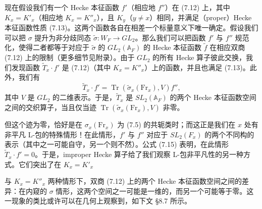 \documentclass[11pt,a4paper]{article}
\newcommand{\Tr}{\operatorname{Tr}}
\begin{document}
现在假设我们有一个 Hecke 本征函数 $f'$（相应地 $f''$）在 (7.12) 上，其中 $K_x=K'_x$（相应地 $K_x=K''_x$），且 $K_y$（$y\neq x$）相同，并满足（proper）Hecke 本征函数性质 (7.13)。这两个函数各自在相差一个标量意义下唯一确定。假设我们可以把 $\sigma$ 提升为非分歧同态 $\tilde\sigma: W_F\to GL_2$。那么我们可以把函数 $f'$ 与 $f''$ 规范化，使得二者都等于对应于 $\tilde\sigma$ 的 $GL_2(\mathbb{A}_F)$ 的 Hecke 本征函数 $\tilde f$ 在相应双商 (7.12) 上的限制（更多细节见附录）。由于 $GL_2$ 的所有 Hecke 算子彼此交换，我们发现函数 $\widetilde{T}_x\cdot f'$ 是 (7.12)（其中 $K_x=K''_x$）上的函数，并且也满足 (7.13)。此外，我们有
\begin{equation}\tag{7.15}
\widetilde{T}_x\cdot f' = \Tr(\tilde\sigma_x(\mathrm{Fr}_x),V)f'',
\end{equation}
其中 $V$ 是 $GL_2$ 的二维表示。于是，$\widetilde{T}_x$ 是 $SL_2(\mathbb{A}_F)$ 的两个 Hecke 本征函数空间之间的交织算子，当且仅当迹 $\Tr(\tilde\sigma_x(\mathrm{Fr}_x),V)$ 非零。

但这个迹为零，恰好是在 $\sigma_x(\mathrm{Fr}_x)$ 为 (7.5) 的共轭类时；而这正是我们在 $x$ 处有非平凡 L-包的特殊情形！在此情形，$f'$ 与 $f''$ 对应于 $SL_2(F_x)$ 的两个不同构的表示（其中之一可能自守，另一个则不然）。公式 (7.15) 表明，在此情形 $\widetilde{T}_x\cdot f'=0$。于是，improper Hecke 算子给了我们观察 L-包非平凡性的另一种方式。它们突出了在 $K_x=K'_x$


与 $K_x=K''_x$ 两种情形下，双商 (7.12) 上的两个 Hecke 本征函数空间之间的差异：在内窥的 $\sigma$ 情形，这两个空间之一可能是一维的，而另一个可能等于零。这一现象的类比或许可以在几何上观察到，如下文 §8.7 所示。


\end{document}
